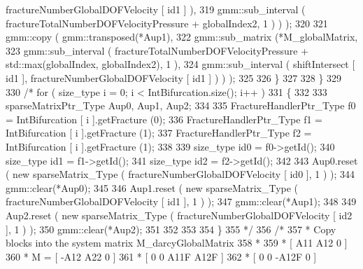 \begin{DoxyCode}
      fractureNumberGlobalDOFVelocity [ id1 ] ),
319                                         gmm::sub\_interval (  fractureTotalNumberDOFVelocityPressure + 
      globalIndex2, 1 ) ) );
320 
321             gmm::copy ( gmm::transposed(*Aup1), 
322                         gmm::sub\_matrix (*M\_globalMatrix,
323                                         gmm::sub\_interval (  fractureTotalNumberDOFVelocityPressure + 
      std::max(globalIndex, globalIndex2), 1 ),
324                                         gmm::sub\_interval ( shiftIntersect [ id1 ], 
      fractureNumberGlobalDOFVelocity [ id1 ] ) ) );
325 
326          \}
327         
328     \}
329     
330   \textcolor{comment}{/*  for ( size\_type i = 0; i < IntBifurcation.size(); i++ )}
331 \textcolor{comment}{    \{}
332 \textcolor{comment}{        }
333 \textcolor{comment}{        sparseMatrixPtr\_Type Aup0, Aup1, Aup2;}
334 \textcolor{comment}{            }
335 \textcolor{comment}{        FractureHandlerPtr\_Type f0 = IntBifurcation [ i ].getFracture (0);}
336 \textcolor{comment}{        FractureHandlerPtr\_Type f1 = IntBifurcation [ i ].getFracture (1);}
337 \textcolor{comment}{        FractureHandlerPtr\_Type f2 = IntBifurcation [ i ].getFracture (1);}
338 \textcolor{comment}{        }
339 \textcolor{comment}{        size\_type id0 = f0->getId();}
340 \textcolor{comment}{        size\_type id1 = f1->getId();}
341 \textcolor{comment}{        size\_type id2 = f2->getId();}
342 \textcolor{comment}{        }
343 \textcolor{comment}{        Aup0.reset ( new sparseMatrix\_Type ( fractureNumberGlobalDOFVelocity [ id0 ], 1 ) );}
344 \textcolor{comment}{        gmm::clear(*Aup0);}
345 \textcolor{comment}{}
346 \textcolor{comment}{        Aup1.reset ( new sparseMatrix\_Type ( fractureNumberGlobalDOFVelocity [ id1 ], 1 ) );}
347 \textcolor{comment}{        gmm::clear(*Aup1);}
348 \textcolor{comment}{}
349 \textcolor{comment}{        Aup2.reset ( new sparseMatrix\_Type ( fractureNumberGlobalDOFVelocity [ id2 ], 1 ) );}
350 \textcolor{comment}{        gmm::clear(*Aup2);}
351 \textcolor{comment}{}
352 \textcolor{comment}{        }
353 \textcolor{comment}{}
354 \textcolor{comment}{    \}}
355 \textcolor{comment}{    */}
356     \textcolor{comment}{/*}
357 \textcolor{comment}{     *      Copy blocks into the system matrix M\_darcyGlobalMatrix}
358 \textcolor{comment}{     *      }
359 \textcolor{comment}{     *              [  A11  A12  0          ]}
360 \textcolor{comment}{     *          M = [ -A12  A22  0          ]}
361 \textcolor{comment}{     *              [  0    0    A11F  A12F ]}
362 \textcolor{comment}{     *              [  0    0   -A12F  0    ]       }

\end{DoxyCode}
